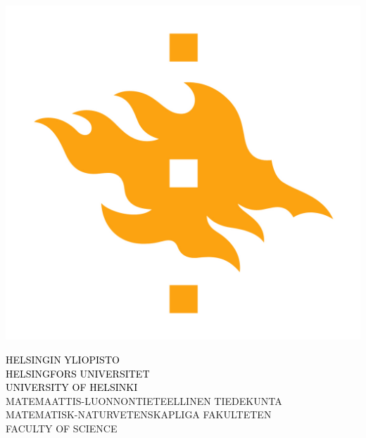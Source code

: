 \documentclass[portrait,a0]{a0poster}
\begin{document}
\large



\begin{minipage}[t]{.4\linewidth} %
\vspace{0pt} %
\includegraphics[height=0.35\linewidth]{HYlogo_fac_text-en}
\hspace{50pt}
\end{minipage} %

\vspace{-12cm}
\begin{minipage}[t]{.98\linewidth} %
\vspace{0pt} %
\begin{flushright}
\begin{spacing}{5}
{\Huge{}\textcolor{black}{\MakeUppercase{Helsingin Yliopisto}} \MakeUppercase{}}\\
{\Huge{}\textcolor{black}{\MakeUppercase{Helsingfors Universitet}} \MakeUppercase{}}\\
{\Huge{}\textcolor{black}{\MakeUppercase{University of Helsinki}} \MakeUppercase{}}\\
{\Huge{}\textcolor{facultyColor}{\MakeUppercase{Matemaattis-Luonnontieteellinen tiedekunta}} \MakeUppercase{}}\\
{\Huge{}\textcolor{facultyColor}{\MakeUppercase{Matematisk-Naturvetenskapliga fakulteten}} \MakeUppercase{}}\\
{\Huge{}\textcolor{facultyColor}{\MakeUppercase{Faculty of Science}} \MakeUppercase{}}\\
\end{spacing}
\end{flushright}
\hspace{50pt}

\end{minipage} %
\end{document}
